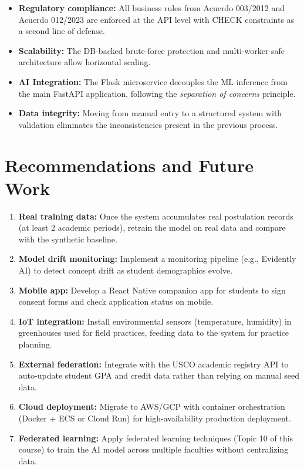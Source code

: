 \documentclass[12pt,a4paper]{article}
\begin{document}
\begin{itemize}
  \item \textbf{Regulatory compliance:} All business rules from Acuerdo 003/2012 and
        Acuerdo 012/2023 are enforced at the API level with CHECK constraints as a
        second line of defense.
  \item \textbf{Scalability:} The DB-backed brute-force protection and multi-worker-safe
        architecture allow horizontal scaling.
  \item \textbf{AI Integration:} The Flask microservice decouples the ML inference from the
        main FastAPI application, following the \textit{separation of concerns} principle.
  \item \textbf{Data integrity:} Moving from manual entry to a structured system with
        validation eliminates the inconsistencies present in the previous process.
\end{itemize}

\section{Recommendations and Future Work}

\begin{enumerate}
  \item \textbf{Real training data:} Once the system accumulates real postulation records
        (at least 2 academic periods), retrain the model on real data and compare with the
        synthetic baseline.
  \item \textbf{Model drift monitoring:} Implement a monitoring pipeline (e.g., Evidently AI)
        to detect concept drift as student demographics evolve.
  \item \textbf{Mobile app:} Develop a React Native companion app for students to sign consent
        forms and check application status on mobile.
  \item \textbf{IoT integration:} Install environmental sensors (temperature, humidity) in
        greenhouses used for field practices, feeding data to the system for practice planning.
  \item \textbf{External federation:} Integrate with the USCO academic registry API to
        auto-update student GPA and credit data rather than relying on manual seed data.
  \item \textbf{Cloud deployment:} Migrate to AWS/GCP with container orchestration (Docker +
        ECS or Cloud Run) for high-availability production deployment.
  \item \textbf{Federated learning:} Apply federated learning techniques (Topic 10 of this
        course) to train the AI model across multiple faculties without centralizing data.
\end{enumerate}
\end{document}
